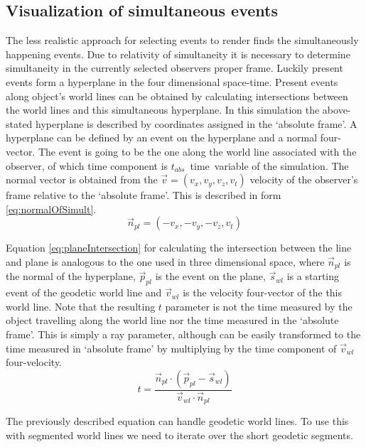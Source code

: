 \documentclass{egpubl}
\begin{document}
\subsection{Visualization of simultaneous events}
\label{visOfSimEvents}
The less realistic approach for selecting events to render finds the simultaneously happening events. Due to relativity of simultaneity it is necessary to determine simultaneity in the currently selected observers proper frame. Luckily present events form a hyperplane in the four dimensional space-time. Present events along object's world lines can be obtained by calculating intersections between the world lines and this simultaneous hyperplane. In this simulation the above-stated hyperplane is described by coordinates assigned in the `absolute frame'. A hyperplane can be defined by an event on the hyperplane and a normal four-vector. The event is going to be the one along the world line associated with the observer, of which time component is $t_{abs}$~time~variable of the simulation. The normal vector is obtained from the $\vec{v}=(v_x, v_y, v_z, v_t)$ velocity of the observer's frame relative to the `absolute frame'. This is described in form \ref{eq:normalOfSimult}.
\begin{equation}
\vec{n}_{pl} = (-v_x, -v_y, -v_z, v_t)
\label{eq:normalOfSimult}
\end{equation}

Equation \ref{eq:planeIntersection} for calculating the intersection between the line and plane is analogous to the one used in three dimensional space, where $\vec{n}_{pl}$ is the normal of the hyperplane, $\vec{p}_{pl}$ is the event on the plane, $\vec{s}_{wl}$ is a starting event of the geodetic world line and $\vec{v}_{wl}$ is the velocity four-vector of the this world line. Note that the resulting $t$ parameter is not the time measured by the object travelling along the world line nor the time measured in the `absolute frame'. This is simply a ray parameter, although can be easily transformed to the time measured in `absolute frame' by multiplying by the time component of $\vec{v}_{wl}$ four-velocity.
\begin{equation}
\label{eq:planeIntersection}
t = \frac{\vec{n}_{pl}\cdot(\vec{p}_{pl} - \vec{s}_{wl})}{\vec{v}_{wl}\cdot\vec{n}_{pl}}
\end{equation}

The previously described equation can handle geodetic world lines. To use this with segmented world lines we need to iterate over the short geodetic segments. 
\end{document}
